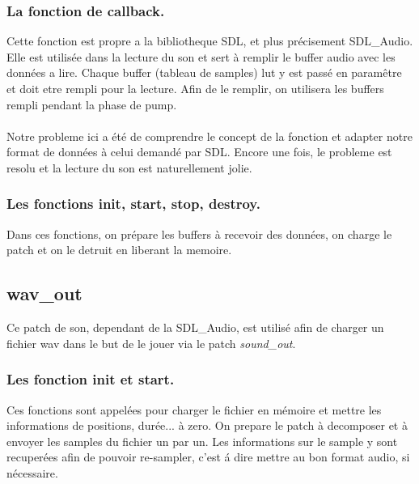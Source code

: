 \subsubsection{La fonction de \textbf{callback}.}
  \par
  Cette fonction est propre a la bibliotheque SDL, et plus pr\'ecisement SDL\_Audio. Elle est
  utilis\'ee dans la lecture du son et sert \`a remplir le buffer audio avec les donn\'ees a lire.
  Chaque buffer (tableau de samples) lut y est pass\'e en param\^etre et doit etre rempli pour
  la lecture. Afin de le remplir, on utilisera les buffers rempli pendant la phase de pump.
  \\
  \\
  Notre probleme ici a \'et\'e de comprendre le concept de la fonction et adapter notre format de
  donn\'ees \`a celui demand\'e par SDL. Encore une fois, le probleme est resolu et la lecture du
  son est naturellement jolie.
  \\
\subsubsection{Les fonctions \textbf{init}, \textbf{start}, \textbf{stop}, \textbf{destroy}.}
  \par
  Dans ces fonctions, on pr\'epare les buffers \`a recevoir des donn\'ees, on charge le patch et
  on le detruit en liberant la memoire.

\subsection{wav\_out}
\par
Ce patch de son, dependant de la SDL\_Audio, est utilis\'e afin de charger un fichier wav dans
le but de le jouer via le patch \textit{sound\_out}.
\subsubsection{Les fonction \textbf{init} et \textbf{start}.}
\par
Ces fonctions sont appel\'ees pour charger le fichier en m\'emoire et mettre les informations de
positions, dur\'ee... \`a zero. On prepare le patch \`a decomposer et \`a envoyer les samples du
fichier un par un. Les informations sur le sample y sont recuper\'ees afin de pouvoir re-sampler,
c'est \'a dire mettre au bon format audio, si n\'ecessaire.
